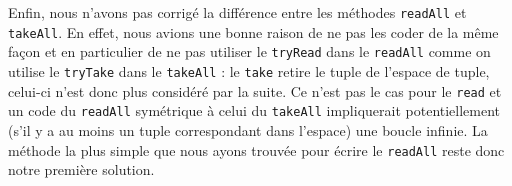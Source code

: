 \documentclass[10pt, a4paper]{article}
\begin{document}
	Enfin, nous n'avons pas corrigé la différence entre les méthodes \texttt{readAll} et \texttt{takeAll}. En effet, nous avions une bonne raison de ne pas les coder de la même façon et en particulier de ne pas utiliser le \texttt{tryRead} dans le \texttt{readAll} comme on utilise le \texttt{tryTake} dans le \texttt{takeAll} : le \texttt{take} retire le tuple de l'espace de tuple, celui-ci n'est donc plus considéré par la suite. Ce n'est pas le cas pour le \texttt{read} et un code du \texttt{readAll} symétrique à celui du \texttt{takeAll} impliquerait potentiellement (s'il y a au moins un tuple correspondant dans l'espace) une boucle infinie. La méthode la plus simple que nous ayons trouvée pour écrire le \texttt{readAll} reste donc notre première solution.
	
\end{document}

